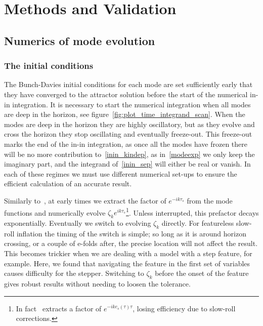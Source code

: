 \chapter{Methods and Validation}\label{chapter:methods}
\section{Numerics of mode evolution}
    \subsection{The initial conditions}
    The Bunch-Davies initial conditions for each mode are set sufficiently early that they
    have converged to the attractor solution before the start of the numerical in-in integration.
    It is necessary to start the numerical integration when all modes are deep
    in the horizon, see figure~\ref{fig:plot_time_integrand_scan}.
    When the modes are deep in the horizon they are highly oscillatory, but as they evolve
    and cross the horizon they stop oscillating and eventually freeze-out.
    This freeze-out marks the end of the in-in integration,
    as once all the modes have frozen there will be no more contribution to~\eqref{inin_kindep},
    as in~\eqref{modeexp} we only keep the imaginary part,
    and the integrand of~\eqref{inin_sep} will either be real or vanish.
    In each of these regimes we must use different numerical set-ups to
    ensure the efficient calculation of an accurate result.


Similarly to~\cite{Funakoshi}, at early times we extract the factor of $e^{-ik\tau_s}$ from the mode functions
and numerically evolve $\zeta_ke^{ik\tau_s}$\footnote{
    In fact~\cite{Funakoshi} extracts a factor of $e^{-ikc_s(\tau)\tau}$, losing efficiency
    due to slow-roll corrections.
}.
Unless interrupted, this prefactor decays exponentially.
Eventually we switch to evolving $\zeta_k$ directly.
For featureless slow-roll inflation the timing of the switch is simple;
so long as it is around horizon crossing, or a couple of e-folds after,
the precise location will not affect the result.
This becomes trickier when we are dealing with a model with
a step feature, for example.
Here, we found that navigating the feature in the first set of variables
causes difficulty for the stepper.
Switching to $\zeta_k$ before the onset of the feature
gives robust results without needing to loosen the tolerance.

